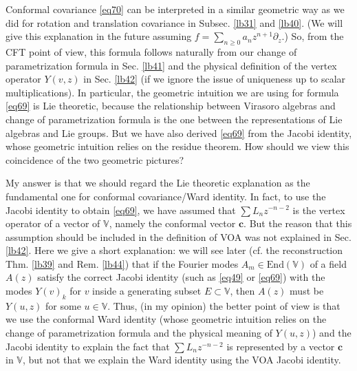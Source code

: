 \documentclass[11pt,b5paper,notitlepage]{article}
\theoremstyle{definition}
\theoremstyle{plain}
\newcommand{\End}{\mathrm{End}} %
\newcommand{\Vbb}{\mathbb V}
\newcommand{\cbf}{\mathbf c}
\numberwithin{equation}{section}
\begin{document}
Conformal covariance \eqref{eq70} can be interpreted in a similar geometric way as we did for rotation and translation covariance in Subsec. \ref{lb31} and \ref{lb40}. (We will give this explanation in the future assuming $f=\sum_{n\geq 0}a_nz^{n+1}\partial_z$.) So, from the CFT point of view, this formula follows naturally from our change of parametrization formula in Sec. \ref{lb41} and the physical definition of the vertex operator $Y(v,z)$ in Sec. \ref{lb42} (if we ignore the issue of uniqueness up to scalar multiplications). In particular, the geometric intuition we are using for formula \eqref{eq69} is Lie theoretic, because the relationship between Virasoro algebras and change of parametrization formula is the one between the representations of Lie algebras and Lie groups. But we have also derived \eqref{eq69} from the Jacobi identity, whose geometric intuition relies on the residue theorem. How should we view this coincidence of the two geometric pictures?



My answer is that we should regard the Lie theoretic explanation as the fundamental one for conformal covariance/Ward identity. In fact, to use the Jacobi identity to   obtain \eqref{eq69}, we have assumed that $\sum L_nz^{-n-2}$ is the vertex operator of a vector of $\Vbb$, namely the conformal vector $\cbf$. But the reason that this assumption should be included in the definition of VOA was not explained in Sec. \ref{lb42}. Here we give a short explanation: we will see later (cf. the reconstruction Thm. \ref{lb39} and Rem. \ref{lb44}) that if the Fourier modes $A_m\in\End(\Vbb)$ of a  field $A(z)$ satisfy the correct Jacobi identity (such as \eqref{eq49} or \eqref{eq69}) with the modes $Y(v)_k$ for $v$ inside a generating subset $E\subset\Vbb$, then $A(z)$ must be $Y(u,z)$ for some $u\in \Vbb$. Thus, (in my opinion) the better point of view is that we use the conformal Ward identity (whose geometric intuition relies on the change of parametrization formula and the physical meaning of $Y(u,z)$) and the Jacobi identity to explain the fact that $\sum L_nz^{-n-2}$ is represented by a vector $\cbf$ in $\Vbb$, but not that we explain the Ward identity using the VOA Jacobi identity.
\end{document}
